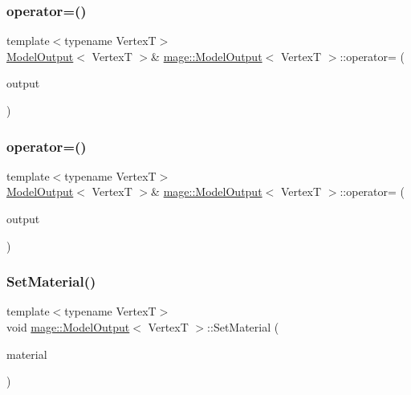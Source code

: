 \subsubsection{\texorpdfstring{operator=()}{operator=()}\hspace{0.1cm}{\footnotesize\ttfamily [1/2]}}
{\footnotesize\ttfamily template$<$typename VertexT$>$ \\
\hyperlink{structmage_1_1_model_output}{Model\+Output}$<$ VertexT $>$\& \hyperlink{structmage_1_1_model_output}{mage\+::\+Model\+Output}$<$ VertexT $>$\+::operator= (\begin{DoxyParamCaption}\item[{const \hyperlink{structmage_1_1_model_output}{Model\+Output}$<$ VertexT $>$ \&}]{output }\end{DoxyParamCaption})\hspace{0.3cm}{\ttfamily [delete]}}

\hypertarget{structmage_1_1_model_output_a5e368e3ae8a52d329f8d9b5f1c4b9d03}{}\label{structmage_1_1_model_output_a5e368e3ae8a52d329f8d9b5f1c4b9d03} 
\subsubsection{\texorpdfstring{operator=()}{operator=()}\hspace{0.1cm}{\footnotesize\ttfamily [2/2]}}
{\footnotesize\ttfamily template$<$typename VertexT$>$ \\
\hyperlink{structmage_1_1_model_output}{Model\+Output}$<$ VertexT $>$\& \hyperlink{structmage_1_1_model_output}{mage\+::\+Model\+Output}$<$ VertexT $>$\+::operator= (\begin{DoxyParamCaption}\item[{\hyperlink{structmage_1_1_model_output}{Model\+Output}$<$ VertexT $>$ \&\&}]{output }\end{DoxyParamCaption})\hspace{0.3cm}{\ttfamily [delete]}}

\hypertarget{structmage_1_1_model_output_abd614f9f2e9f9dbc0b2c354ee37f2998}{}\label{structmage_1_1_model_output_abd614f9f2e9f9dbc0b2c354ee37f2998} 
\subsubsection{\texorpdfstring{Set\+Material()}{SetMaterial()}}
{\footnotesize\ttfamily template$<$typename VertexT$>$ \\
void \hyperlink{structmage_1_1_model_output}{mage\+::\+Model\+Output}$<$ VertexT $>$\+::Set\+Material (\begin{DoxyParamCaption}\item[{const string \&}]{material }\end{DoxyParamCaption})}

